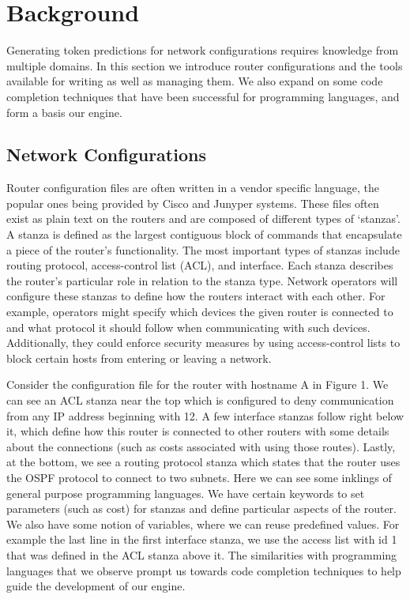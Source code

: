 \section{Background}

Generating token predictions for network configurations requires knowledge from multiple domains. In this section we introduce router configurations and the tools available for writing as well as managing them. We also expand on some code completion techniques that have been successful for programming languages, and form a basis our engine.

\subsection{Network Configurations} 

Router configuration files are often written in a vendor specific language, the popular ones being provided by Cisco and Junyper systems. These files often exist as plain text on the routers and are composed of different types of `stanzas'. A stanza is defined as the largest contiguous block of commands that encapsulate a piece of the router's functionality. The most important types of stanzas include routing protocol, access-control list (ACL), and interface. Each stanza describes the router's particular role in relation to the stanza type. Network operators will configure these stanzas to define how the routers interact with each other. For example, operators might specify which devices the given router is connected to and what protocol it should follow when communicating with such devices. Additionally, they could enforce security measures by using access-control lists to block certain hosts from entering or leaving a network. 

 Consider the configuration file for the router with hostname A in Figure 1. We can see an ACL stanza near the top which is configured to deny communication from any IP address beginning with 12. A few interface stanzas follow right below it, which define how this router is connected to other routers with some details about the connections (such as costs associated with using those routes). Lastly, at the bottom, we see a routing protocol stanza which states that the router uses the OSPF protocol to connect to two subnets. Here we can see some inklings of general purpose programming languages. We have certain keywords to set parameters (such as cost) for stanzas and define particular aspects of the router. We also have some notion of variables, where we can reuse predefined values. For example the last line in the first interface stanza, we use the access list with id 1 that was defined in the ACL stanza above it. The similarities with programming languages that we observe prompt us towards code completion techniques to help guide the development of our engine.

